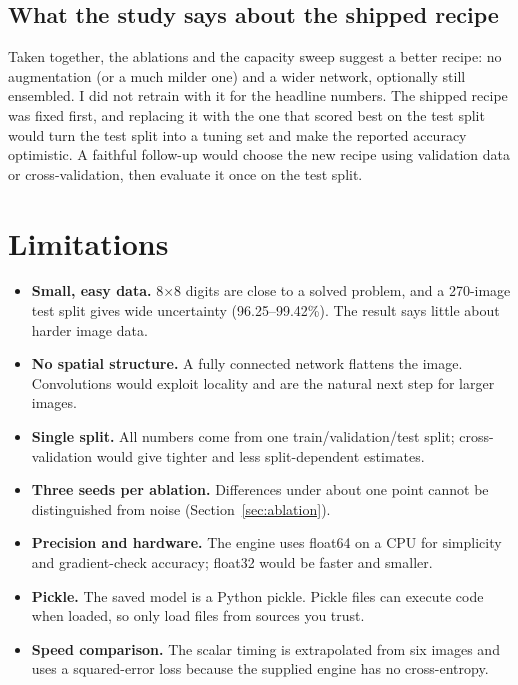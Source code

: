 \documentclass[11pt,a4paper]{article}
\begin{document}
\subsection{What the study says about the shipped recipe}
Taken together, the ablations and the capacity sweep suggest a better recipe: no augmentation (or a much milder one) and a wider network, optionally still ensembled. I did not retrain with it for the headline numbers. The shipped recipe was fixed first, and replacing it with the one that scored best on the test split would turn the test split into a tuning set and make the reported accuracy optimistic. A faithful follow-up would choose the new recipe using validation data or cross-validation, then evaluate it once on the test split.

\section{Limitations}
\begin{itemize}
  \item \textbf{Small, easy data.} 8$\times$8 digits are close to a solved problem, and a 270-image test split gives wide uncertainty (96.25--99.42\%). The result says little about harder image data.
  \item \textbf{No spatial structure.} A fully connected network flattens the image. Convolutions would exploit locality and are the natural next step for larger images.
  \item \textbf{Single split.} All numbers come from one train/validation/test split; cross-validation would give tighter and less split-dependent estimates.
  \item \textbf{Three seeds per ablation.} Differences under about one point cannot be distinguished from noise (Section~\ref{sec:ablation}).
  \item \textbf{Precision and hardware.} The engine uses float64 on a CPU for simplicity and gradient-check accuracy; float32 would be faster and smaller.
  \item \textbf{Pickle.} The saved model is a Python pickle. Pickle files can execute code when loaded, so only load files from sources you trust.
  \item \textbf{Speed comparison.} The scalar timing is extrapolated from six images and uses a squared-error loss because the supplied engine has no cross-entropy.
\end{itemize}
\end{document}
